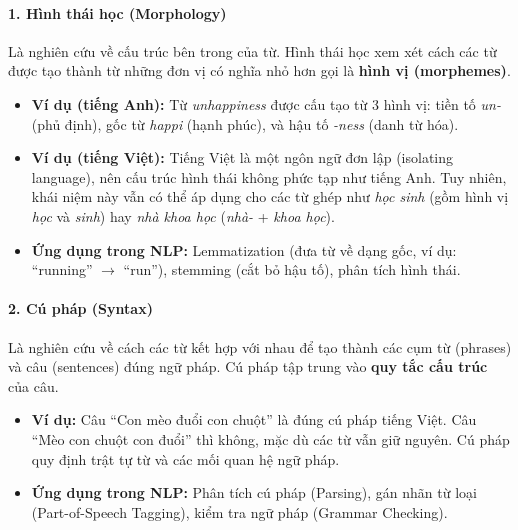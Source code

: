 \paragraph{1. Hình thái học (Morphology)}
Là nghiên cứu về cấu trúc bên trong của từ. Hình thái học xem xét cách các từ được tạo thành từ những đơn vị có nghĩa nhỏ hơn gọi là \textbf{hình vị (morphemes)}.
\begin{itemize}
    \item \textbf{Ví dụ (tiếng Anh):} Từ \textit{unhappiness} được cấu tạo từ 3 hình vị: tiền tố \textit{un-} (phủ định), gốc từ \textit{happi} (hạnh phúc), và hậu tố \textit{-ness} (danh từ hóa).
    \item \textbf{Ví dụ (tiếng Việt):} Tiếng Việt là một ngôn ngữ đơn lập (isolating language), nên cấu trúc hình thái không phức tạp như tiếng Anh. Tuy nhiên, khái niệm này vẫn có thể áp dụng cho các từ ghép như \textit{học sinh} (gồm hình vị \textit{học} và \textit{sinh}) hay \textit{nhà khoa học} (\textit{nhà-} + \textit{khoa học}).
    \item \textbf{Ứng dụng trong NLP:} Lemmatization (đưa từ về dạng gốc, ví dụ: “running” $\rightarrow$ “run”), stemming (cắt bỏ hậu tố), phân tích hình thái.
\end{itemize}

\paragraph{2. Cú pháp (Syntax)}
Là nghiên cứu về cách các từ kết hợp với nhau để tạo thành các cụm từ (phrases) và câu (sentences) đúng ngữ pháp. Cú pháp tập trung vào \textbf{quy tắc cấu trúc} của câu.
\begin{itemize}
    \item \textbf{Ví dụ:} Câu “Con mèo đuổi con chuột” là đúng cú pháp tiếng Việt. Câu “Mèo con chuột con đuổi” thì không, mặc dù các từ vẫn giữ nguyên. Cú pháp quy định trật tự từ và các mối quan hệ ngữ pháp.
    \item \textbf{Ứng dụng trong NLP:} Phân tích cú pháp (Parsing), gán nhãn từ loại (Part-of-Speech Tagging), kiểm tra ngữ pháp (Grammar Checking).
\end{itemize}

